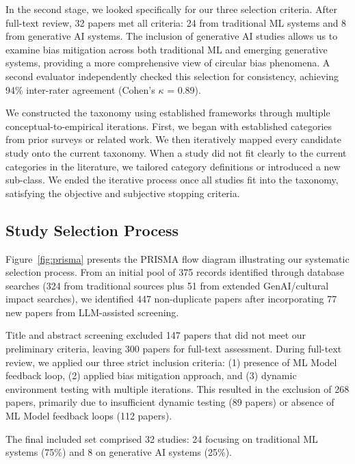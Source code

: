 \documentclass[11pt]{article}
\begin{document}
In the second stage, we looked specifically for our three selection criteria. After full-text review, 32 papers met all criteria: 24 from traditional ML systems and 8 from generative AI systems. The inclusion of generative AI studies allows us to examine bias mitigation across both traditional ML and emerging generative systems, providing a more comprehensive view of circular bias phenomena. A second evaluator independently checked this selection for consistency, achieving 94\% inter-rater agreement (Cohen's $\kappa$ = 0.89).

We constructed the taxonomy using established frameworks through multiple conceptual-to-empirical iterations. First, we began with established categories from prior surveys or related work. We then iteratively mapped every candidate study onto the current taxonomy. When a study did not fit clearly to the current categories in the literature, we tailored category definitions or introduced a new sub-class. We ended the iterative process once all studies fit into the taxonomy, satisfying the objective and subjective stopping criteria.

\subsection{Study Selection Process}

Figure~\ref{fig:prisma} presents the PRISMA flow diagram illustrating our systematic selection process. From an initial pool of 375 records identified through database searches (324 from traditional sources plus 51 from extended GenAI/cultural impact searches), we identified 447 non-duplicate papers after incorporating 77 new papers from LLM-assisted screening.

Title and abstract screening excluded 147 papers that did not meet our preliminary criteria, leaving 300 papers for full-text assessment. During full-text review, we applied our three strict inclusion criteria: (1) presence of ML Model feedback loop, (2) applied bias mitigation approach, and (3) dynamic environment testing with multiple iterations. This resulted in the exclusion of 268 papers, primarily due to insufficient dynamic testing (89 papers) or absence of ML Model feedback loops (112 papers).

The final included set comprised 32 studies: 24 focusing on traditional ML systems (75\%) and 8 on generative AI systems (25\%).
\end{document}
